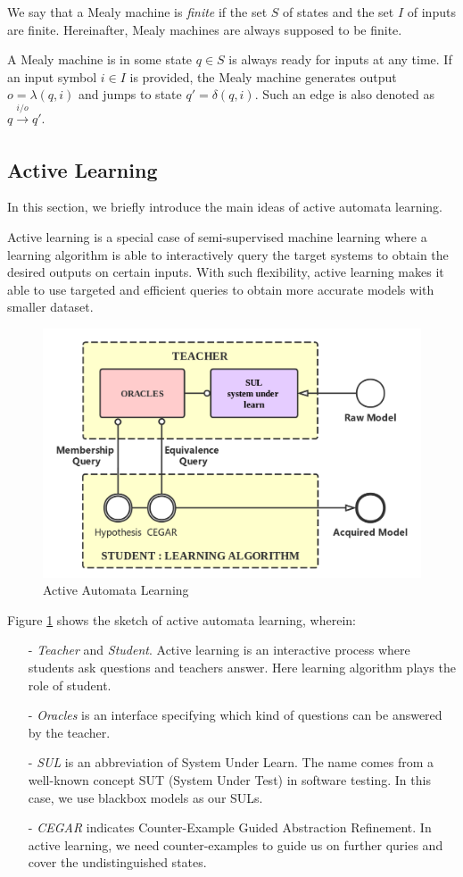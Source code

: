 \documentclass[conference, a4paper]{IEEEtran}
\begin{document}
We say that a Mealy machine is \emph{finite} if the set $S$ of states and the set $I$ of inputs are
finite. Hereinafter, Mealy machines are always supposed to be finite.

A Mealy machine is in some state $q\in S$ is always ready for inputs at any time. If an input symbol
$i\in I$ is provided, the Mealy machine generates output $o=\lambda(q,i)$ and jumps to state
$q'=\delta(q,i)$. Such an edge is also denoted as $q\xrightarrow[]{i/o}q'$.


\subsection{Active Learning}
In this section, we briefly introduce the main ideas of active automata learning. 

Active learning \cite{settles2010active} is a special case of semi-supervised machine learning where
a learning algorithm is able to interactively query the target systems to obtain the desired outputs
on certain inputs. With such flexibility, active learning makes it able to use targeted and efficient
queries to obtain more accurate models with smaller dataset. 


\begin{figure}[ht]
  \begin{center}
    \includegraphics[width=.5\textwidth]{./images/activelearning.png}
  \end{center}
  \caption{Active Automata Learning}
  \label{fig:activelearning}
\end{figure}

Figure \ref{fig:activelearning} shows the sketch of active automata learning, wherein:
\begin{itemize}
  \item[-] \emph{Teacher} and \emph{Student}. Active learning is an interactive process where
    students ask questions and teachers answer. Here learning algorithm plays the role of student.
  \item[-] \emph{Oracles} is an interface specifying which kind of questions can be answered by the
    teacher.
  \item[-] \emph{SUL} is an abbreviation of System Under Learn. The name comes from a well-known
    concept SUT (System Under Test) in software testing. In this case, we use blackbox models as our
    SULs.
  \item[-] \emph{CEGAR} indicates Counter-Example Guided Abstraction
    Refinement\cite{DBLP:conf/cav/ClarkeGJLV00}. In active learning, we need counter-examples to
    guide us on further quries and cover the undistinguished states.
\end{itemize}
\end{document}
